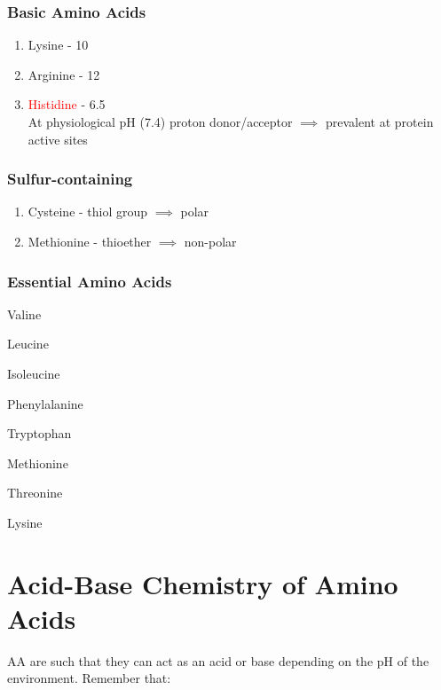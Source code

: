 \documentclass[../Bio_chemistryReview.tex]{subfiles}
\begin{document}
\subsubsection{Basic Amino Acids}
\begin{enumerate} [topsep=2pt,itemsep=-2pt,leftmargin=13pt]
  \item Lysine - 10
  \item Arginine - 12
  \item \textcolor{red}{Histidine} - 6.5 \hfill \\ At physiological pH (7.4)
    proton donor/acceptor $\implies$ prevalent at protein active sites
\end{enumerate}

\subsubsection{Sulfur-containing}
\begin{enumerate} [topsep=2pt,itemsep=-2pt,leftmargin=13pt]
  \item Cysteine - thiol group $\implies$ polar
  \item Methionine - thioether $\implies$ non-polar
\end{enumerate}

\subsubsection{Essential Amino Acids}
\begin{inparaenum}[1)]
\item Valine
\item Leucine
\item Isoleucine
\item Phenylalanine
\item Tryptophan
\item Methionine
\item Threonine
\item Lysine
\end{inparaenum}

\section{Acid-Base Chemistry of Amino Acids\supdag}

AA are  such that they can act as an acid or base depending on the pH of the environment. Remember that:
\end{document}

